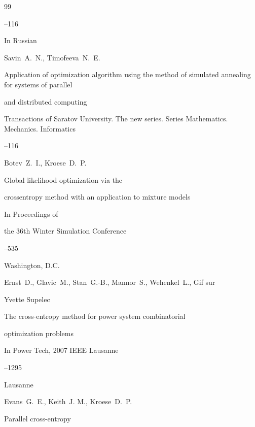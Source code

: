 \begin{thebibliography}{99}




--116

\misctransl

\lang In Russian

\by Savin~A.~N., Timofeeva~N.~E.

\paper Application of optimization algorithm using the method of simulated annealing for systems of parallel

and distributed computing

\jour Transactions of Saratov University. The new series. Series Mathematics. Mechanics. Informatics




--116




\by  Botev~Z.~I.,  Kroese~D.~P.

\paper Global likelihood optimization via the

crossentropy method with an application to mixture models

\inbook In Proceedings of

the 36th Winter Simulation Conference

--535

\publaddr Washington, D.C.





\by Ernst~D., Glavic~M., Stan~G.-B.,  Mannor~S.,  Wehenkel~L., Gif sur

Yvette Supelec

\paper  The cross-entropy method for power system combinatorial

optimization problems

\inbook In Power Tech, 2007 IEEE Lausanne

--1295

\publaddr Lausanne





\by Evans~G.~E., Keith~J. M., Kroese~D.~P.

\paper Parallel cross-entropy


\end{thebibliography}
